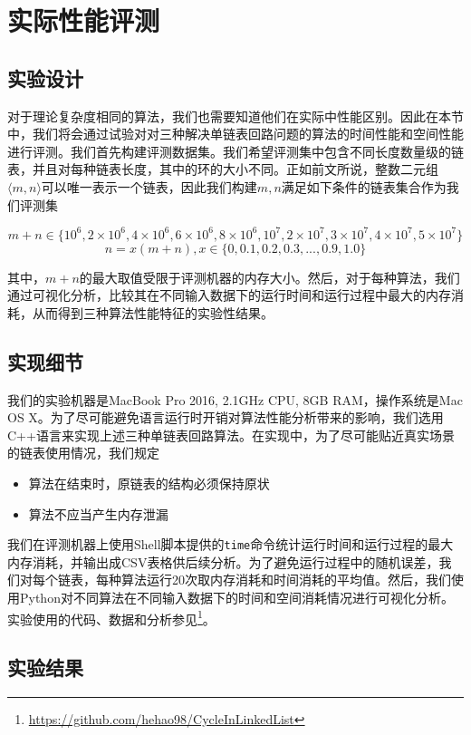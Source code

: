 \documentclass[UTF8]{ctexart}
\begin{document}
\section{实际性能评测}

\subsection{实验设计}

对于理论复杂度相同的算法，我们也需要知道他们在实际中性能区别。因此在本节中，我们将会通过试验对对三种解决单链表回路问题的算法的时间性能和空间性能进行评测。我们首先构建评测数据集。我们希望评测集中包含不同长度数量级的链表，并且对每种链表长度，其中的环的大小不同。正如前文所说，整数二元组$\langle m, n\rangle$可以唯一表示一个链表，因此我们构建$m, n$满足如下条件的链表集合作为我们评测集

$$
m+n\in \{10^6, 2 \times 10^6, 4 \times 10^6, 6 \times 10^6, 8 \times 10^6, 10^7, 2\times 10^7, 3\times 10^7, 4\times 10^7, 5\times 10^7\}
$$
$$
n = x(m + n), x \in \{0, 0.1, 0.2, 0.3, ..., 0.9, 1.0\}
$$

其中，$m+n$的最大取值受限于评测机器的内存大小。然后，对于每种算法，我们通过可视化分析，比较其在不同输入数据下的运行时间和运行过程中最大的内存消耗，从而得到三种算法性能特征的实验性结果。


\subsection{实现细节}

我们的实验机器是MacBook Pro 2016, 2.1GHz CPU, 8GB RAM，操作系统是Mac OS X。为了尽可能避免语言运行时开销对算法性能分析带来的影响，我们选用C++语言来实现上述三种单链表回路算法。在实现中，为了尽可能贴近真实场景的链表使用情况，我们规定

\begin{itemize}
\item 算法在结束时，原链表的结构必须保持原状
\item 算法不应当产生内存泄漏
\end{itemize}

我们在评测机器上使用Shell脚本提供的\texttt{time}命令统计运行时间和运行过程的最大内存消耗，并输出成CSV表格供后续分析。为了避免运行过程中的随机误差，我们对每个链表，每种算法运行20次取内存消耗和时间消耗的平均值。然后，我们使用Python对不同算法在不同输入数据下的时间和空间消耗情况进行可视化分析。实验使用的代码、数据和分析参见\footnote{\url{https://github.com/hehao98/CycleInLinkedList}}。

\subsection{实验结果}
\end{document}
